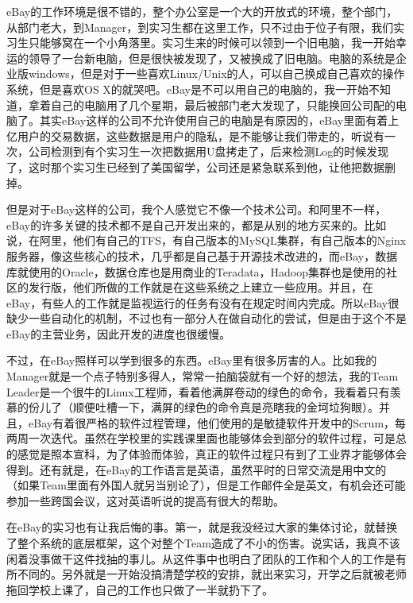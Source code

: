 eBay的工作环境是很不错的，整个办公室是一个大的开放式的环境，整个部门，从部门老大，到Manager，到实习生都在这里工作，只不过由于位子有限，我们实习生只能够窝在一个小角落里。实习生来的时候可以领到一个旧电脑，我一开始幸运的领导了一台新电脑，但是很快被发现了，又被换成了旧电脑。电脑的系统是企业版windows，但是对于一些喜欢Linux/Unix的人，可以自己换成自己喜欢的操作系统，但是喜欢OS X的就哭吧。eBay是不可以用自己的电脑的，我一开始不知道，拿着自己的电脑用了几个星期，最后被部门老大发现了，只能换回公司配的电脑了。其实eBay这样的公司不允许使用自己的电脑是有原因的，eBay里面有着上亿用户的交易数据，这些数据是用户的隐私，是不能够让我们带走的，听说有一次，公司检测到有个实习生一次把数据用U盘拷走了，后来检测Log的时候发现了，这时那个实习生已经到了美国留学，公司还是紧急联系到他，让他把数据删掉。\par

但是对于eBay这样的公司，我个人感觉它不像一个技术公司。和阿里不一样，eBay的许多关键的技术都不是自己开发出来的，都是从别的地方买来的。比如说，在阿里，他们有自己的TFS，有自己版本的MySQL集群，有自己版本的Nginx服务器，像这些核心的技术，几乎都是自己基于开源技术改进的，而eBay，数据库就使用的Oracle，数据仓库也是用商业的Teradata，Hadoop集群也是使用的社区的发行版，他们所做的工作就是在这些系统之上建立一些应用。并且，在eBay，有些人的工作就是监视运行的任务有没有在规定时间内完成。所以eBay很缺少一些自动化的机制，不过也有一部分人在做自动化的尝试，但是由于这个不是eBay的主营业务，因此开发的进度也很缓慢。\par

不过，在eBay照样可以学到很多的东西。eBay里有很多厉害的人。比如我的Manager就是一个点子特别多得人，常常一拍脑袋就有一个好的想法，我的Team Leader是一个很牛的Linux工程师，看着他满屏卷动的绿色的命令，我看着只有羡慕的份儿了（顺便吐槽一下，满屏的绿色的命令真是亮瞎我的金坷垃狗眼）。并且，eBay有着很严格的软件过程管理，他们使用的是敏捷软件开发中的Scrum，每两周一次迭代。虽然在学校里的实践课里面也能够体会到部分的软件过程，可是总的感觉是照本宣科，为了体验而体验，真正的软件过程只有到了工业界才能够体会得到。还有就是，在eBay的工作语言是英语，虽然平时的日常交流是用中文的（如果Team里面有外国人就另当别论了），但是工作邮件全是英文，有机会还可能参加一些跨国会议，这对英语听说的提高有很大的帮助。\par

在eBay的实习也有让我后悔的事。第一，就是我没经过大家的集体讨论，就替换了整个系统的底层框架，这个对整个Team造成了不小的伤害。说实话，我真不该闲着没事做干这件找抽的事儿。从这件事中也明白了团队的工作和个人的工作是有所不同的。另外就是一开始没搞清楚学校的安排，就出来实习，开学之后就被老师拖回学校上课了，自己的工作也只做了一半就扔下了。

